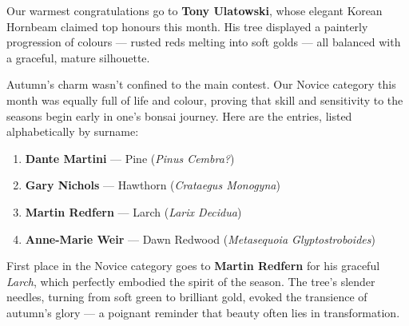 \noindent
Our warmest congratulations go to \textbf{Tony Ulatowski}, whose elegant Korean Hornbeam claimed top honours this month.
His tree displayed a painterly progression of colours --- rusted reds melting into soft golds --- all balanced with a graceful, mature silhouette.


\medskip
{}
\noindent
Autumn's charm wasn't confined to the main contest.
Our Novice category this month was equally full of life and colour, proving that skill and sensitivity to the seasons begin early in one's bonsai journey.
Here are the entries, listed alphabetically by surname:

\begin{enumerate}
    \item \textbf{Dante Martini} --- Pine (\textit{Pinus Cembra?})
    \item \textbf{Gary Nichols} --- Hawthorn (\textit{Crataegus Monogyna})
    \item \textbf{Martin Redfern} --- Larch (\textit{Larix Decidua})
    \item \textbf{Anne\--Marie Weir} --- Dawn Redwood (\textit{Metasequoia Glyptostroboides})
\end{enumerate}

\noindent
First place in the Novice category goes to \textbf{Martin Redfern} for his graceful \textit{Larch}, which perfectly embodied the spirit of the season.
The tree's slender needles, turning from soft green to brilliant gold, evoked the transience of autumn's glory --- a poignant reminder that beauty often lies in transformation.

